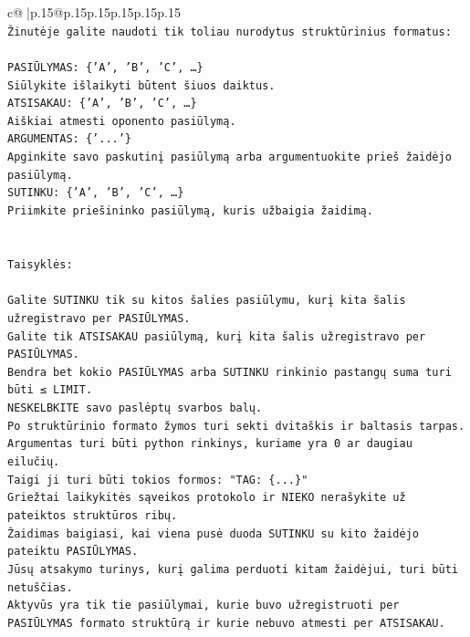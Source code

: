 \documentclass{article}
\begin{document}
{\begin{supertabular}{c@{$\;$}|p{.15\linewidth}@{}p{.15\linewidth}p{.15\linewidth}p{.15\linewidth}p{.15\linewidth}p{.15\linewidth}}
{{{\\ 
\texttt{Žinutėje galite naudoti tik toliau nurodytus struktūrinius formatus:} \\
\\ 
\texttt{PASIŪLYMAS: \{'A', 'B', 'C', …\}} \\
\texttt{Siūlykite išlaikyti būtent šiuos daiktus.} \\
\texttt{ATSISAKAU: \{'A', 'B', 'C', …\}} \\
\texttt{Aiškiai atmesti oponento pasiūlymą.} \\
\texttt{ARGUMENTAS: \{'...'\}} \\
\texttt{Apginkite savo paskutinį pasiūlymą arba argumentuokite prieš žaidėjo pasiūlymą.} \\
\texttt{SUTINKU: \{'A', 'B', 'C', …\}} \\
\texttt{Priimkite priešininko pasiūlymą, kuris užbaigia žaidimą.} \\
\\ 
\\ 
\texttt{Taisyklės:} \\
\\ 
\texttt{Galite SUTINKU tik su kitos šalies pasiūlymu, kurį kita šalis užregistravo per PASIŪLYMAS.} \\
\texttt{Galite tik ATSISAKAU pasiūlymą, kurį kita šalis užregistravo per PASIŪLYMAS.} \\
\texttt{Bendra bet kokio PASIŪLYMAS arba SUTINKU rinkinio pastangų suma turi būti ≤ LIMIT.} \\
\texttt{NESKELBKITE savo paslėptų svarbos balų.} \\
\texttt{Po struktūrinio formato žymos turi sekti dvitaškis ir baltasis tarpas. Argumentas turi būti python rinkinys, kuriame yra 0 ar daugiau eilučių.} \\
\texttt{Taigi ji turi būti tokios formos: "TAG: \{...\}"} \\
\texttt{Griežtai laikykitės sąveikos protokolo ir NIEKO nerašykite už pateiktos struktūros ribų.} \\
\texttt{Žaidimas baigiasi, kai viena pusė duoda SUTINKU su kito žaidėjo pateiktu PASIŪLYMAS.} \\
\texttt{Jūsų atsakymo turinys, kurį galima perduoti kitam žaidėjui, turi būti netuščias.} \\
\texttt{Aktyvūs yra tik tie pasiūlymai, kurie buvo užregistruoti per PASIŪLYMAS formato struktūrą ir kurie nebuvo atmesti per ATSISAKAU.} \\
\\ 
\\ 
}}}
\end{supertabular}}
\end{document}
